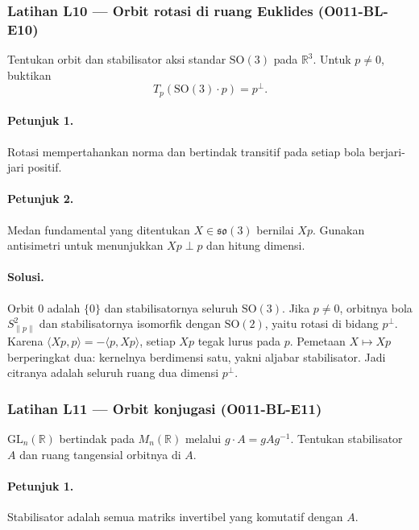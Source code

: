 \subsubsection*{Latihan L10 — Orbit rotasi di ruang Euklides (O011-BL-E10)}
\label{o011-bl-e10}

Tentukan orbit dan stabilisator aksi standar $\mathrm{SO}(3)$ pada
$\mathbb R^3$. Untuk $p\ne0$, buktikan
\[
  T_p(\mathrm{SO}(3)\cdot p)=p^\perp.
\]

\paragraph{Petunjuk 1.}
Rotasi mempertahankan norma dan bertindak transitif pada setiap bola berjari-jari
positif.

\paragraph{Petunjuk 2.}
Medan fundamental yang ditentukan $X\in\mathfrak{so}(3)$ bernilai $Xp$.
Gunakan antisimetri untuk menunjukkan $Xp\perp p$ dan hitung dimensi.

\paragraph{Solusi.}
Orbit $0$ adalah $\{0\}$ dan stabilisatornya seluruh $\mathrm{SO}(3)$. Jika
$p\ne0$, orbitnya bola $S^2_{\|p\|}$ dan stabilisatornya isomorfik dengan
$\mathrm{SO}(2)$, yaitu rotasi di bidang $p^\perp$. Karena
$\langle Xp,p\rangle=-\langle p,Xp\rangle$, setiap $Xp$ tegak lurus pada
$p$. Pemetaan $X\mapsto Xp$ berperingkat dua: kernelnya berdimensi satu,
yakni aljabar stabilisator. Jadi citranya adalah seluruh ruang dua dimensi
$p^\perp$.

\subsubsection*{Latihan L11 — Orbit konjugasi (O011-BL-E11)}
\label{o011-bl-e11}

$\mathrm{GL}_n(\mathbb R)$ bertindak pada $M_n(\mathbb R)$ melalui
$g\cdot A=gAg^{-1}$. Tentukan stabilisator $A$ dan ruang tangensial orbitnya
di $A$.

\paragraph{Petunjuk 1.}
Stabilisator adalah semua matriks invertibel yang komutatif dengan $A$.

